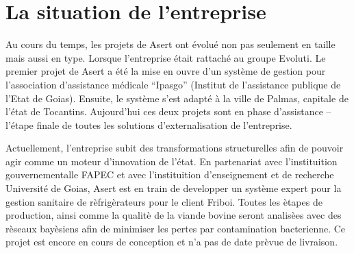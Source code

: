 


\section{La situation de l'entreprise}

Au cours du temps, les projets de Asert ont évolué non pas seulement en taille mais aussi en type. Lorsque l'entreprise était rattaché au groupe Evoluti. Le premier projet de Asert a été la mise en ouvre d'un système de gestion pour l'association d'assistance médicale ``Ipasgo'' (Institut de l'assistance publique de l'Etat de Goias). Ensuite, le système s'est adapté à la ville de Palmas, capitale de l'état de Tocantins. Aujourd'hui ces deux projets sont en phase d'assistance -- l'étape finale de toutes les solutions d'externalisation de l'entreprise.

Actuellement, l'entreprise subit des transformations structurelles afin de pouvoir agir comme un moteur d'innovation de l'état. En partenariat avec l'instituition gouvernementalle FAPEC et avec l'instituition d'enseignement et de recherche Université de Goias, Asert est en train de developper un système expert pour la gestion sanitaire de rèfrigèrateurs pour le client Friboi. Toutes les ètapes de production, ainsi comme la qualitè de la viande bovine seront analisèes avec des rèseaux bayèsiens afin de minimiser les pertes par contamination bacterienne. Ce projet est encore en cours de conception et n'a pas de date prèvue de livraison.





